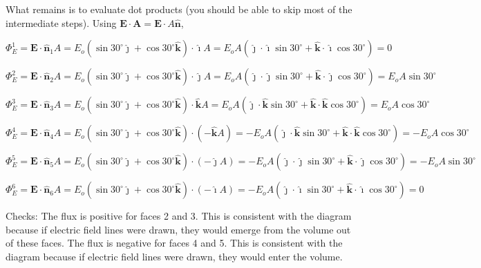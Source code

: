 \documentclass{article}
\newcommand{\ihat}[0]{\hat{\boldsymbol{\imath}}}
\newcommand{\jhat}[0]{\hat{\boldsymbol{\jmath}}}
\newcommand{\khat}[0]{\hat{\boldsymbol{k}}}
\begin{document}
What remains is to evaluate dot products (you should be able to skip most of the intermediate steps). Using $\mathbf{E}\cdot\mathbf{A}=\mathbf{E}\cdot A\hat{\mathbf{n}}$,

$$\Phi_E^1=\mathbf{E}\cdot \hat{\mathbf{n}}_1A=E_o(\sin 30^\circ\jhat+\cos 30^\circ\khat)\cdot\ihat A = E_oA(\jhat\cdot\ihat\sin 30^\circ+\khat\cdot\ihat\cos 30^\circ)=0$$

$$\Phi_E^2=\mathbf{E}\cdot \hat{\mathbf{n}}_2A=E_o(\sin 30^\circ\jhat+\cos 30^\circ\khat)\cdot\jhat A = E_oA(\jhat\cdot\jhat\sin 30^\circ+\khat\cdot\jhat\cos 30^\circ)=E_oA\sin 30^\circ$$

$$\Phi_E^3=\mathbf{E}\cdot \hat{\mathbf{n}}_3A=E_o(\sin 30^\circ\jhat+\cos 30^\circ\khat)\cdot\khat A = E_oA(\jhat\cdot\khat\sin 30^\circ+\khat\cdot\khat\cos 30^\circ)=E_oA\cos 30^\circ$$

$$\Phi_E^4=\mathbf{E}\cdot \hat{\mathbf{n}}_4A=E_o(\sin 30^\circ\jhat+\cos 30^\circ\khat)\cdot(-\khat A) = -E_oA(\jhat\cdot\khat\sin 30^\circ+\khat\cdot\khat\cos 30^\circ)=-E_oA\cos 30^\circ$$

$$\Phi_E^5=\mathbf{E}\cdot \hat{\mathbf{n}}_5A=E_o(\sin 30^\circ\jhat+\cos 30^\circ\khat)\cdot(-\jhat A) = -E_oA(\jhat\cdot\jhat\sin 30^\circ+\khat\cdot\jhat\cos 30^\circ)=-E_oA\sin 30^\circ$$

$$\Phi_E^6=\mathbf{E}\cdot \hat{\mathbf{n}}_6A=E_o(\sin 30^\circ\jhat+\cos 30^\circ\khat)\cdot(-\ihat A) =  -E_oA(\jhat\cdot\ihat\sin 30^\circ+\khat\cdot\ihat\cos 30^\circ)=0$$

Checks: The flux is positive for faces 2 and 3. This is consistent with the diagram because if electric field lines were drawn, they would emerge from the volume out of these faces. The flux is negative for faces 4 and 5. This is consistent with the diagram because if electric field lines were drawn, they would enter the volume.
\fi
\end{document}
